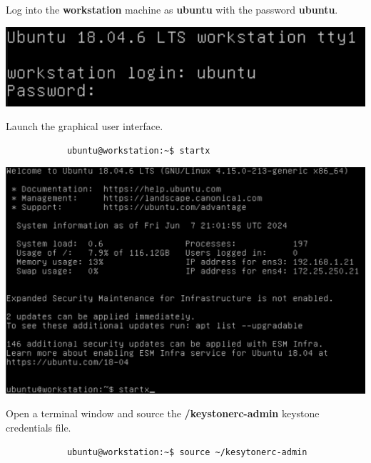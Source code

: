 \documentclass[letterpaper, 12pt]{article}
\begin{document}
\begin{enumerate}
    \begin{labstep}
        Log into the \textbf{workstation} machine as \textbf{ubuntu} with the password \textbf{ubuntu}.

        \begin{center}
            \includegraphics[width=\linewidth]{images/part1/step1.png}
        \end{center}
    \end{labstep}

    \begin{labstep}
        Launch the graphical user interface.
        \begin{lstlisting}
            ubuntu@workstation:~$ startx
        \end{lstlisting}

        \begin{center}
            \includegraphics[width=\linewidth]{images/part1/step2.png}
        \end{center}
    \end{labstep}

    \begin{labstep}
        Open a terminal window and source the \textbf{\texttildemid/keystonerc-admin} keystone credentials file.
        \begin{lstlisting}
            ubuntu@workstation:~$ source ~/kesytonerc-admin
        \end{lstlisting}


\end{labstep}
\end{enumerate}
\end{document}
